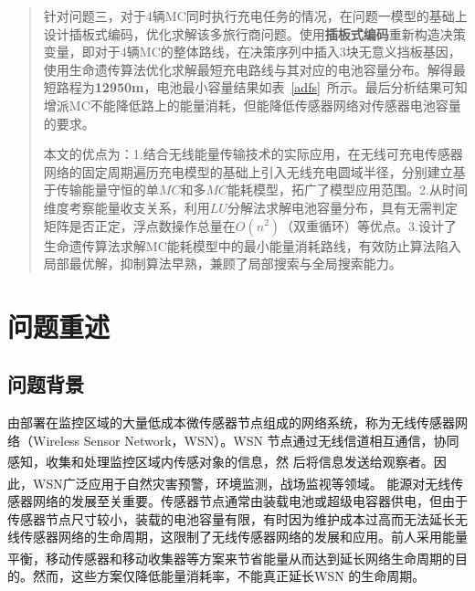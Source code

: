 \documentclass{whutmod}
\newcommand{\upcite}[1]{\textsuperscript{\cite{#1}}}
\begin{document}
\begin{abstract}
		针对问题三，对于4辆MC同时执行充电任务的情况，在问题一模型的基础上设计插板式编码，优化求解该多旅行商问题。使用\textbf{插板式编码}重新构造决策变量，即对于4辆MC的整体路线，在决策序列中插入$3$块无意义挡板基因，使用生命遗传算法优化求解最短充电路线与其对应的电池容量分布。解得最短路程为\textbf{12950m}，电池最小容量结果如表~\ref{adfs}~所示。最后分析结果可知增派MC不能降低路上的能量消耗，但能降低传感器网络对传感器电池容量的要求。
		
	
		本文的优点为：1.结合无线能量传输技术的实际应用，在无线可充电传感器网络的固定周期遍历充电模型的基础上引入无线充电圆域半径，分别建立基于传输能量守恒的单$MC$和多$MC$能耗模型，拓广了模型应用范围。2.从时间维度考察能量收支关系，利用$LU$分解法求解电池容量分布，具有无需判定矩阵是否正定，浮点数操作总量在$O(n^2)$（双重循环）等优点。3.设计了生命遗传算法求解MC能耗模型中的最小能量消耗路线，有效防止算法陷入局部最优解，抑制算法早熟，兼顾了局部搜索与全局搜索能力。
	\end{abstract}


	\thispagestyle{empty}
	\tableofcontents
	\setcounter{page}{0}                                               
	\newpage	%
	

	
	\section{问题重述}	
		\subsection{问题背景}
	    	由部署在监控区域的大量低成本微传感器节点组成的网络系统，称为无线传感器网络（Wireless Sensor Network，WSN）。WSN 节点通过无线信道相互通信，协同感知，收集和处理监控区域内传感对象的信息，然
	    	后将信息发送给观察者\upcite{1}。因此，WSN广泛应用于自然灾害预警，环境监测，战场监视等领域\upcite{2}。
	    	能源对无线传感器网络的发展至关重要。传感器节点通常由装载电池或超级电容器供电，但由于传感器节点尺寸较小，装载的电池容量有限，有时因为维护成本过高而无法延长无线传感器网络的生命周期，这限制了无线传感器网络的发展和应用。前人采用能量平衡\upcite{4,5}，移动传感器\upcite{6,7}和移动收集器等方案来节省能量从而达到延长网络生命周期的目的。然而，这些方案仅降低能量消耗率，不能真正延长WSN 的生命周期。
\end{document}
